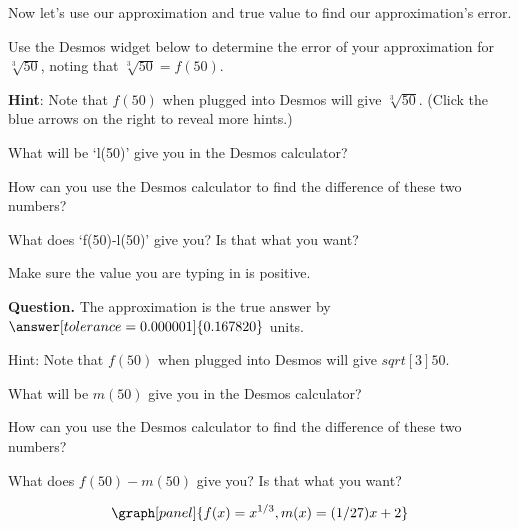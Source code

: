 \documentclass[handout,nooutcomes]{ximera}
\begin{document}
\begin{example}
\begin{explanation}
\medskip

Now let's use our approximation and true value to find our approximation's error.

Use the Desmos widget below to determine the error of your approximation for $\sqrt[3]{50}$, noting that $\sqrt[3]{50} = f(50)$.\\

\bigskip

\textbf{Hint}: Note that $f(50)$ when plugged into Desmos will give $\sqrt[3]{50}$.
(Click the blue arrows on the right to reveal more hints.)

\begin{expandable}
What will be `l(50)' give you in the Desmos calculator?
\end{expandable}
\begin{expandable}
How can you use the Desmos calculator to find the difference of these two numbers?
\end{expandable}
\begin{expandable}
What does `f(50)-l(50)' give you? Is that what you want?
\end{expandable}
\begin{expandable}
Make sure the value you are typing in is positive.
\end{expandable}



\textbf{Question. } The approximation is  the true 
answer by $\answer[tolerance=0.000001]{0.167820}$ units.

\begin{expandable}
Hint: Note that $f(50)$ when plugged into Desmos will give $sqrt[3]{50}$.
\begin{expandable}
What will be $m(50)$ give you in the Desmos calculator?
\begin{expandable}
How can you use the Desmos calculator to find the difference of these two numbers?
\begin{expandable}
What does $f(50)-m(50)$ give you? Is that what you want?
\end{expandable}
\end{expandable}
\end{expandable}
\end{expandable}

\[
\graph[panel]{f(x) = x^{1/3}, m(x) = (1/27) x + 2}
\]


\end{explanation}
\end{example}
\end{document}
